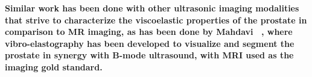 \textbf{Similar work has been done with other ultrasonic imaging modalities that strive
to characterize the viscoelastic properties of the prostate in comparison to MR
imaging, as has been done by Mahdavi \etal~\cite{Mahdavi2011}, where
vibro-elastography has been developed to visualize and segment the prostate in
synergy with B-mode ultrasound, with MRI used as the imaging gold standard.}
